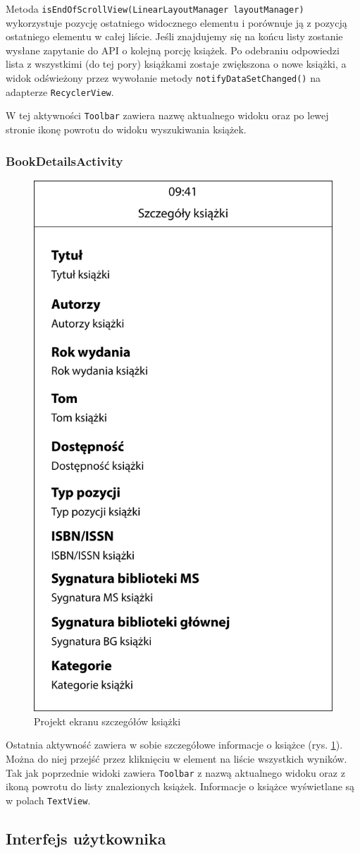 \documentclass[twoside]{projektInzynierskiMS}
\begin{document}
Metoda \verb`isEndOfScrollView(LinearLayoutManager layoutManager)` wykorzystuje pozycję ostatniego widocznego elementu i porównuje ją z pozycją ostatniego elementu w całej liście. Jeśli znajdujemy się na końcu listy zostanie wysłane zapytanie do API o kolejną porcję książek. Po odebraniu odpowiedzi lista z wszystkimi (do tej pory) książkami zostaje zwiększona o nowe książki, a widok odświeżony przez wywołanie metody \verb`notifyDataSetChanged()` na adapterze \verb`RecyclerView`. 

W tej aktywności \verb`Toolbar` zawiera nazwę aktualnego widoku oraz po lewej stronie ikonę powrotu do widoku wyszukiwania książek. 

\subsubsection{BookDetailsActivity}

\begin{figure}[h]
  \centering
  \includegraphics[width=0.4\linewidth]{img/DetailsProject.png}
  \caption{Projekt ekranu szczegółów książki}
  \label{fig:androidDetails}
\end{figure}

Ostatnia aktywność zawiera w sobie szczegółowe informacje o książce (rys. \ref{fig:androidDetails}). Można do niej przejść przez kliknięciu w element na liście wszystkich wyników. Tak jak poprzednie widoki zawiera \verb`Toolbar` z nazwą aktualnego widoku oraz z ikoną powrotu do listy znalezionych książek. Informacje o książce wyświetlane są w polach \verb`TextView`.  

\subsection{Interfejs użytkownika}
\end{document}
